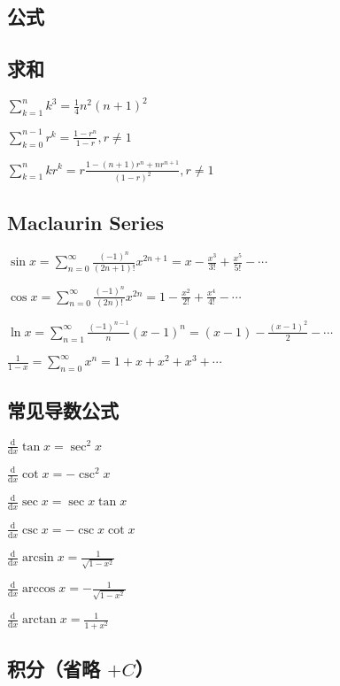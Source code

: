 \documentclass[9pt,landscape]{article}
\begin{document}
\begin{multicols}{3}

\columnseprule=0.25pt

\section{公式}

\subsection{求和}

$\sum_{k=1}^{n}k^3=\frac{1}{4}n^2(n+1)^2$

$\sum_{k=0}^{n-1}r^k=\frac{1-r^n}{1-r}, r\neq 1$

$\sum_{k=1}^{n}kr^k=r\frac{1-(n+1)r^n+nr^{n+1}}{(1-r)^2}, r\neq 1$

\subsection{Maclaurin Series}

$\sin x = \sum_{n=0}^{\infty} \frac{(-1)^n}{(2n+1)!}x^{2n+1} = x - \frac{x^3}{3!} + \frac{x^5}{5!} - \cdots$

$\cos x = \sum_{n=0}^{\infty} \frac{(-1)^n}{(2n)!}x^{2n} = 1 - \frac{x^2}{2!} + \frac{x^4}{4!} - \cdots$

$\ln x = \sum_{n=1}^{\infty} \frac{(-1)^{n-1}}{n}(x-1)^n = (x-1) - \frac{(x-1)^2}{2} - \cdots$

$\frac{1}{1-x} = \sum_{n=0}^{\infty} x^n = 1 + x + x^2 + x^3 + \cdots$

\subsection{常见导数公式}

$\frac{\mathrm{d}}{\mathrm{d}x}\tan x=\sec ^{2}x$

$\frac{\mathrm{d}}{\mathrm{d}x}\cot x=-\csc ^{2}x$

$\frac{\mathrm{d}}{\mathrm{d}x}\sec x=\sec x\tan x$

$\frac{\mathrm{d}}{\mathrm{d}x}\csc x=-\csc x\cot x$

$\frac{\mathrm{d}}{\mathrm{d}x}\arcsin x={\frac {1}{\sqrt {1-x^{2}}}}$

$\frac{\mathrm{d}}{\mathrm{d}x}\arccos x=-{\frac {1}{\sqrt {1-x^{2}}}}$

$\frac{\mathrm{d}}{\mathrm{d}x}\arctan x={\frac {1}{1+x^{2}}}$

\subsection{积分（省略 $+C$）}


\end{multicols}
\end{document}
